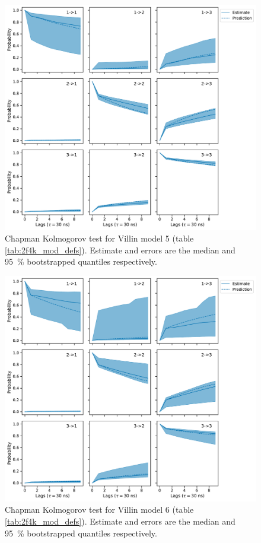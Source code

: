 \documentclass{article}
\begin{document}
\begin{figure}
    \centering
    \includegraphics[height=0.4\textheight]{figures/cktests/villin/m2_dihed_hpix17_cktest.pdf}
    \caption{Chapman Kolmogorov test for Villin model 5 (table \ref{tab:2f4k_mod_defs}). Estimate and errors are the median and \SI{95}{\percent} bootstrapped quantiles respectively.}
    \label{fig:cktest_villin_5}
\end{figure}

\begin{figure}
    \centering
    \includegraphics[height=0.4\textheight]{figures/cktests/villin/m2_logit(dist)_hpix14_cktest.pdf}
    \caption{Chapman Kolmogorov test for Villin model 6 (table \ref{tab:2f4k_mod_defs}). Estimate and errors are the median and \SI{95}{\percent} bootstrapped quantiles respectively.}
    \label{fig:cktest_villin_6}
\end{figure}
\end{document}
